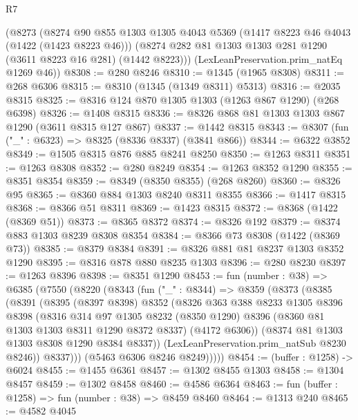 \begin{lexlean}{R7}
\begin{coremodule}
    (@8273
      (@8274
        @90
        @855
        @1303
        @1305
        @4043
        @5369
        (@1417 @8223 @46 @4043 (@1422 (@1423 @8223 @46)))
        (@8274 @282 @81 @1303 @1303 @281 @1290 (@3611 @8223 @16 @281) (@1442 @8223)))
      (LexLeanPreservation.prim_natEq @1269 @46))
@8308 := @280 @8246
@8310 := @1345 (@1965 @8308)
@8311 := @268 @6306
@8315 := @8310 (@1345 (@1349 @8311) @5313)
@8316 := @2035 @8315
@8325 := @8316 @124 @870 @1305 @1303 (@1263 @867 @1290) (@268 @6398)
@8326 := @1408 @8315
@8336 := @8326 @868 @81 @1303 @1303 @867 @1290 (@3611 @8315 @127 @867)
@8337 := @1442 @8315
@8343 := @8307 (fun ("_" : @6323) => @8325 (@8336 @8337) (@3841 @866))
@8344 := @6322 @3852
@8349 := @1505 @8315 @876 @885 @8241 @8250
@8350 := @1263 @8311
@8351 := @1263 @8308
@8352 := @280 @8249
@8354 := @1263 @8352 @1290
@8355 := @8351 @8354
@8359 := @8349 (@8350 @8355) (@268 @8260)
@8360 := @8326 @95
@8365 := @8360 @884 @1303 @8240 @8311 @8355
@8366 := @1417 @8315
@8368 := @8366 @51 @8311
@8369 := @1423 @8315
@8372 := @8368 (@1422 (@8369 @51))
@8373 := @8365 @8372
@8374 := @8326 @192
@8379 := @8374 @883 @1303 @8239 @8308 @8354
@8384 := @8366 @73 @8308 (@1422 (@8369 @73))
@8385 := @8379 @8384
@8391 := @8326 @881 @81 @8237 @1303 @8352 @1290
@8395 := @8316 @878 @880 @8235 @1303
@8396 := @280 @8230
@8397 := @1263 @8396
@8398 := @8351 @1290
@8453 := fun (number : @38) =>
  @6385
    (@7550
      (@8220
        (@8343
          (fun ("_" : @8344) =>
          @8359
            (@8373
              (@8385
                (@8391
                  (@8395
                    (@8397 @8398)
                    @8352
                    (@8326
                      @363
                      @388
                      @8233
                      @1305
                      @8396
                      @8398
                      (@8316
                        @314
                        @97
                        @1305
                        @8232
                        (@8350 @1290)
                        @8396
                        (@8360 @81 @1303 @1303 @8311 @1290 @8372 @8337)
                        (@4172 @6306))
                      (@8374 @81 @1303 @1303 @8308 @1290 @8384 @8337))
                    (LexLeanPreservation.prim_natSub @8230 @8246))
                  @8337)))
            (@5463 @6306 @8246 @8249)))))
@8454 := (buffer : @1258) -> @6024
@8455 := @1455 @6361
@8457 := @1302 @8455 @1303
@8458 := @1304 @8457
@8459 := @1302 @8458
@8460 := @4586 @6364
@8463 := fun (buffer : @1258) => fun (number : @38) => @8459 @8460
@8464 := @1313 @240
@8465 := @4582 @4045

\end{coremodule}
\end{lexlean}
